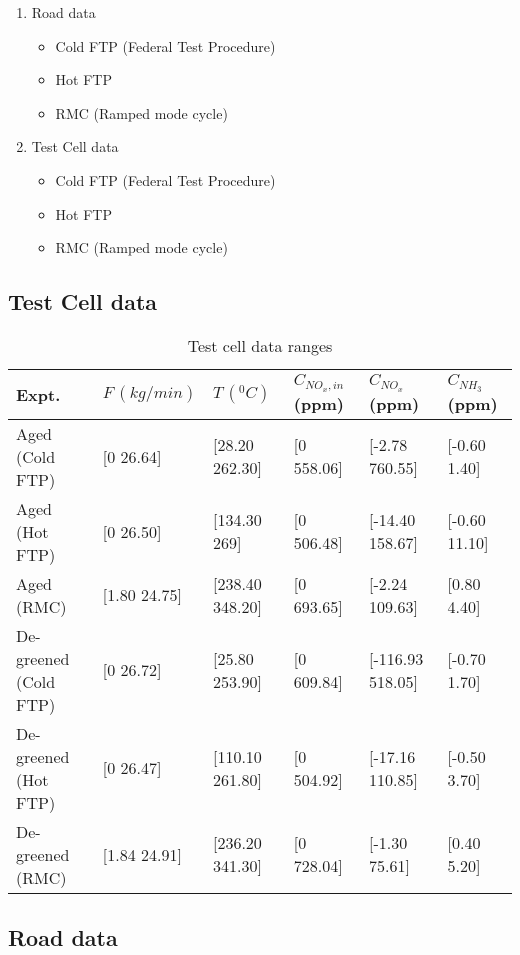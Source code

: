 \begin{enumerate}
    \item Road data
    \begin{itemize}
        \item Cold FTP (Federal Test Procedure)
        \item Hot FTP
        \item RMC (Ramped mode cycle)
    \end{itemize}
    \item Test Cell data
    \begin{itemize}
        \item Cold FTP (Federal Test Procedure)
        \item Hot FTP
        \item RMC (Ramped mode cycle)
    \end{itemize}

\end{enumerate}


\subsection{Test Cell data}

\begin{table}[H]
    \centering
    \begin{tabular}{l l l l l l}
        \hline \hline
Expt. & $F\,(kg/min)$ & $T\, (^0 C)$ & $C_{NO_x, in}$ (ppm) & $ C_{NO_x}$ (ppm) & $C_{NH_3}$ (ppm) \\\hline \hline
Aged (Cold FTP) & [0 26.64] & [28.20 262.30] & [0 558.06] & [-2.78
760.55] & [-0.60 1.40] \\
Aged (Hot FTP) & [0 26.50] & [134.30 269] & [0 506.48] & [-14.40
158.67] & [-0.60 11.10]\\
Aged (RMC) & [1.80 24.75] & [238.40 348.20] & [0 693.65] & [-2.24
109.63] & [0.80 4.40]\\
De-greened (Cold FTP) & [0 26.72] & [25.80 253.90] & [0 609.84] &
[-116.93 518.05] & [-0.70 1.70] \\
De-greened (Hot FTP) & [0 26.47] & [110.10 261.80] & [0 504.92] &
[-17.16 110.85] & [-0.50 3.70]\\
De-greened (RMC) & [1.84 24.91] & [236.20 341.30] & [0 728.04] &
[-1.30 75.61] & [0.40 5.20] \\
\hline \hline
    \end{tabular}
    \caption{Test cell data ranges}
\end{table}
\subsection{Road data}
